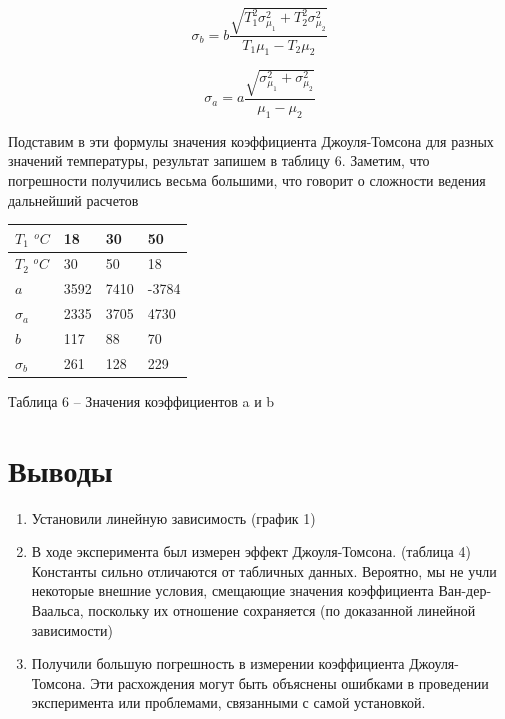 \documentclass[a4paper,12pt]{article} %
\begin{document}
\[
\sigma_b = b \frac{\sqrt{T_1^2 \sigma_{\mu_1}^2 + 
T_2^2 \sigma_{\mu_2}^2}}{T_1 \mu_1 - T_2 \mu_2}
\]

\[
\sigma_a = a \frac{\sqrt{\sigma_{\mu_1}^2 + \sigma_{\mu_2}^2}}{\mu_1 - \mu_2}
\]

Подставим в эти формулы значения коэффициента Джоуля-Томсона для разных значений температуры, результат запишем в таблицу 6. Заметим, что погрешности получились весьма большими, что говорит о сложности ведения дальнейший расчетов

\begin{table}
\begin{center}
\begin{tabular}{|l|l|l|l|}
\hline 
$T_1$  $^oC$ & 18 & 30 & 50 \\ 
\hline 
$T_2$ $^oC$ & 30 & 50 & 18 \\ 
\hline  
$a$ & 3592 & 7410 & -3784 \\ 
\hline 
$\sigma_a$ & 2335 & 3705 & 4730 \\ 
\hline 
$b$ & 117 & 88 & 70 \\ 
\hline 
$\sigma_b$ & 261 & 128 & 229 \\ 
\hline 
\end{tabular} 
\end{center}
\begin{center}

Таблица 6 -- Значения коэффициентов a и b

\end{center}
\end{table}

\section{Выводы}
\begin{enumerate}
\itemsep0em
\item Установили линейную зависимость (график 1)  
\item В ходе эксперимента был измерен эффект Джоуля-Томсона. (таблица 4) Константы сильно отличаются от табличных данных. Вероятно, мы не учли некоторые внешние условия, смещающие значения коэффициента Ван-дер-Ваальса, поскольку их отношение сохраняется (по доказанной линейной зависимости) 
\item Получили большую погрешность в измерении коэффициента Джоуля-Томсона. Эти расхождения могут быть объяснены ошибками в проведении эксперимента или проблемами, связанными с самой установкой. 

\end{enumerate}
\end{document}

